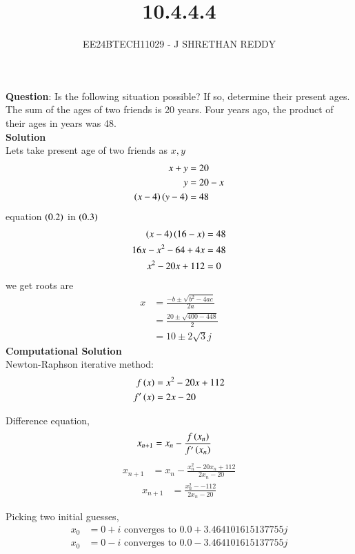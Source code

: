 \documentclass[journal]{IEEEtran}
\begin{document}

\vspace{3cm}

\title{10.4.4.4}
\author{EE24BTECH11029 - J SHRETHAN REDDY}
\maketitle
{\let\newpage\relax\maketitle}

\renewcommand{\thefigure}{\theenumi}
\renewcommand{\thetable}{\theenumi}
\setlength{\intextsep}{10pt} %


\renewcommand{\thetable}{\theenumi}
\textbf{Question}:
Is the following situation possible? If so, determine their present ages.
The sum of the ages of two friends is 20 years. Four years ago, the product of their ages
in years was 48.\\
\textbf{Solution}\\
Lets take present age of two friends as $x,y$\\
\begin{align}
    x + y &= 20\\
    y &= 20 - x\\
    \left(x-4\right)\left(y-4\right) &= 48
\end{align}
equation $\left(0.2\right)$ in $\left(0.3\right)$
\begin{align}
    \left(x-4\right)\left(16-x\right) &= 48\\
    16x-x^2-64+4x &= 48\\
    x^2-20x+112 &= 0
\end{align}
we get roots are
\begin{align}
    x&=\frac{-b\pm \sqrt{b^2-4ac}}{2a}\\
    &=\frac{20\pm \sqrt{400-448}}{2}\\
    &=10\pm 2\sqrt{3}j
\end{align}
\textbf{Computational Solution}\\
Newton-Raphson iterative method:
\begin{align}
    f\left(x\right) &= x^2 -20x + 112\\
    f^\prime\left(x\right) &= 2x - 20
\end{align}

Difference equation,
\begin{align}
    x_{n+1} &= x_n - \frac{f\left(x_{n}\right)}{f^\prime\left(x_n\right)}
\end{align}
\begin{align}
    x_{n+1} &= x_n - \frac{x_n^2 -20x_n + 112}{2x_n - 20}
\end{align}
\begin{align}
    x_{n+1} &= \frac{x_n^2- -112}{2x_n -20}
\end{align}

Picking two initial guesses,
\begin{align}
    x_0 &= 0 + i \text{ converges to } 0.0 + 3.464101615137755j
\end{align}
\begin{align}
    x_0 &= 0 - i \text{ converges to } 0.0 - 3.464101615137755j
\end{align}
\end{document}
